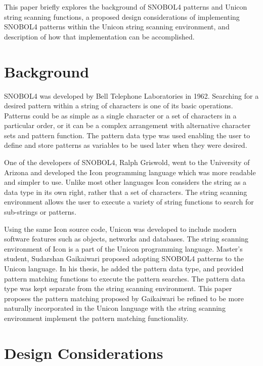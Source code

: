\documentclass{article}
\begin{document}
This paper briefly explores the background of SNOBOL4 patterns and Unicon string scanning functions, a proposed design considerations of implementing SNOBOL4 patterns within the Unicon string scanning environment, and description of how that implementation can be accomplished. 

\section{Background}

SNOBOL4 was developed by Bell Telephone Laboratories in 1962.  Searching for a desired pattern within a string of characters is one of its basic operations.  Patterns could be as simple as a single character or a set of characters in a particular order, or it can be a complex arrangement with alternative character sets and pattern function.  The pattern data type was used enabling the user to define and store patterns as variables to be used later when they were desired.\cite{Snobol}

One of the developers of SNOBOL4, Ralph Griswold, went to the University of Arizona and developed the Icon programming language which was more readable and simpler to use.\cite{JefferyUnicon}  Unlike most other languages Icon considers the string as a data type in its own right, rather that a set of characters. \cite{GriswoldIcon}  The string scanning environment allows the user to execute a variety of string functions to search for sub-strings or patterns.

Using the same Icon source code, Unicon was developed to include modern software features such as objects, networks and databases. \cite{JefferyUnicon} The string scanning environment of Icon is a part of the Unicon programming language.  Master's student, Sudarshan Gaikaiwari proposed adopting SNOBOL4 patterns to the Unicon language.  In his thesis, he added the pattern data type, and provided pattern matching functions to execute the pattern searches.\cite{Gaikaiwari2005}  The pattern data type was kept separate from the string scanning environment.  This paper proposes the pattern matching proposed by Gaikaiwari be refined to be more naturally incorporated in the Unicon language with the string scanning environment implement the pattern matching functionality.

\section{Design Considerations}
\end{document}

